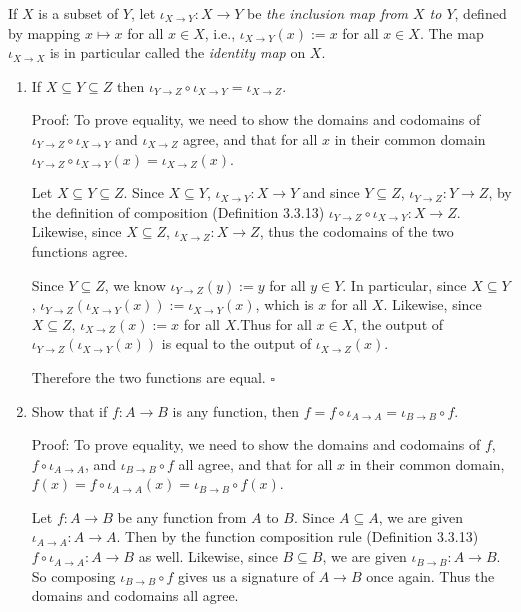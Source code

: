 \documentclass{assignment}
\newenvironment{q}
    {\begin{bfseries}}
    {\end{bfseries}}
\begin{document}
\begin{q} 
    If $X$ is a subset of $Y$, let $\iota_{X\to Y} : X \to Y$ be \emph{the inclusion map from $X$ to $Y$}, defined by mapping $x \mapsto x$ for all $x \in X$, i.e., $\iota_{X\to Y}(x) := x$ for all $x \in X$. 
    The map $\iota_{X\to X}$ is in particular called the \emph{identity map} on $X$.
\end{q}
\begin{enumerate}
    \item 
    \begin{q}
        If $X \subseteq Y \subseteq Z$ then $\iota_{Y\to Z} \circ \iota_{X\to Y} = \iota_{X\to Z}$.
    \end{q}
    
    Proof:
    To prove equality, we need to show the domains and codomains of $\iota_{Y\to Z} \circ \iota_{X\to Y}$ and $\iota_{X\to Z}$ agree, and that for all $x$ in their common domain $\iota_{Y\to Z} \circ \iota_{X\to Y}(x) = \iota_{X\to Z}(x)$.

    Let $X \subseteq Y \subseteq Z$. Since $X \subseteq Y$, $\iota_{X\to Y}: X \to Y$ and since $Y \subseteq Z$, $\iota_{Y\to Z}: Y \to Z$, by the definition of composition (Definition 3.3.13) $\iota_{Y\to Z} \circ \iota_{X\to Y}: X \to Z$. Likewise, since $X \subseteq Z$, $\iota_{X\to Z}: X \to Z$, thus the codomains of the two functions agree.
    
    Since $Y \subseteq Z$, we know $\iota_{Y\to Z}(y) := y$ for all $y \in Y$.
    In particular, since $X \subseteq Y$, $\iota_{Y\to Z}(\iota_{X\to Y}(x)) := \iota_{X\to Y}(x)$, which is $x$ for all $X$. 
    Likewise, since $X \subseteq Z$, $\iota_{X\to Z}(x) := x$ for all $X$.Thus for all $x \in X$, the output of $\iota_{Y\to Z}(\iota_{X\to Y}(x))$ is equal to the output of $\iota_{X\to Z}(x)$.
    
    Therefore the two functions are equal. 
    $\square$

    \item \begin{q}
        Show that if $f: A \to B$ is any function, then $f = f \circ \iota_{A \to A} = \iota_{B \to B} \circ f$.
    \end{q}

    Proof:
    To prove equality, we need to show the domains and codomains of $f$, $f \circ \iota_{A \to A}$, and $\iota_{B \to B} \circ f$ all agree, and that for all $x$ in their common domain, $f(x) = f \circ \iota_{A \to A}(x) = \iota_{B \to B} \circ f(x)$.

    Let $f: A \to B$ be any function from $A$ to $B$. 
    Since $A \subseteq A$, we are given $\iota_{A \to A}: A \to A$. 
    Then by the function composition rule (Definition 3.3.13) $f \circ \iota_{A\to A}: A \to B$ as well. 
    Likewise, since $B \subseteq B$, we are given $\iota_{B \to B}: A \to B$. 
    So composing $\iota_{B\to B} \circ f$ gives us a signature of $A \to B$ once again. 
    Thus the domains and codomains all agree.


\end{enumerate}
\end{document}
